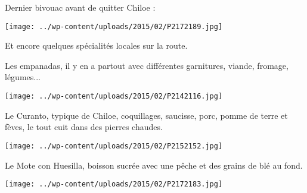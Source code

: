 \pagebreak
  Dernier bivouac avant de quitter Chiloe :
\begin{center} \texttt{[image: ../wp-content/uploads/2015/02/P2172189.jpg]} \end{center}

 Et encore quelques spécialités locales sur la route.

 Les empanadas, il y en a partout avec différentes garnitures, viande, fromage, légumes...
\begin{center} \texttt{[image: ../wp-content/uploads/2015/02/P2142116.jpg]} \end{center}
\vspace{-\topsep}

\pagebreak
 Le Curanto, typique de Chiloe, coquillages, saucisse, porc, pomme de terre et fèves, le tout cuit dans des pierres chaudes.
 \vfill
 \begin{center} \texttt{[image: ../wp-content/uploads/2015/02/P2152152.jpg]} \end{center}

\vfill
 Le Mote con Huesilla, boisson sucrée avec une pêche et des grains de blé au fond.
 \vfill
\begin{center} \texttt{[image: ../wp-content/uploads/2015/02/P2172183.jpg]} \end{center}
\vspace{-\topsep}
\vspace{-0.75mm}